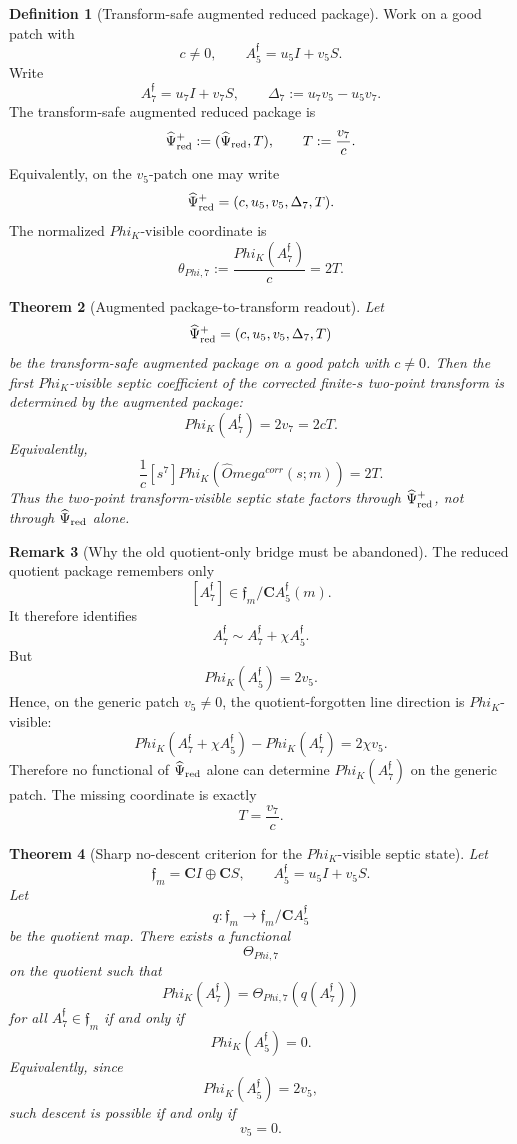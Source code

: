 \documentclass[11pt,a4paper]{amsart}
\def\Omega{Omega}%
\def\Phi{Phi}%
\def\corr{corr}%
\theoremstyle{plain}
\newtheorem{theorem}{Theorem}[section]
\theoremstyle{definition}
\newtheorem{definition}[theorem]{Definition}
\newtheorem{remark}[theorem]{Remark}
\newcommand{\corr}{\mathrm{corr}}
\begin{document}
\begin{definition}[Transform-safe augmented reduced package]
\label{def:transform-safe-augmented-reduced-package}
Work on a good patch with
\[
c\ne0,
\qquad
A_5^{\mathfrak f}=u_5I+v_5S.
\]
Write
\[
A_7^{\mathfrak f}=u_7I+v_7S,
\qquad
\Delta_7:=u_7v_5-u_5v_7.
\]
The transform-safe augmented reduced package is
\[
\widehat\Psi_{\rm red}^{+}
:=
(\widehat\Psi_{\rm red},T),
\qquad
T:=\frac{v_7}{c}.
\]
Equivalently, on the \(v_5\)-patch one may write
\[
\widehat\Psi_{\rm red}^{+}
=
(c,u_5,v_5,\Delta_7,T).
\]
The normalized \(\Phi_K\)-visible coordinate is
\[
\theta_{\Phi,7}
:=
\frac{\Phi_K(A_7^{\mathfrak f})}{c}
=
2T.
\]
\end{definition}

\begin{theorem}[Augmented package-to-transform readout]
\label{thm:augmented-package-to-transform-readout}
Let
\[
\widehat\Psi_{\rm red}^{+}
=
(c,u_5,v_5,\Delta_7,T)
\]
be the transform-safe augmented package on a good patch with \(c\ne0\). Then
the first \(\Phi_K\)-visible septic coefficient of the corrected finite-\(s\)
two-point transform is determined by the augmented package:
\[
\Phi_K(A_7^{\mathfrak f})
=
2v_7
=
2cT.
\]
Equivalently,
\[
\frac{1}{c}
[s^7]\Phi_K(\widehat\Omega^{\corr}(s;m))
=
2T.
\]
Thus the two-point transform-visible septic state factors through
\(\widehat\Psi_{\rm red}^{+}\), not through \(\widehat\Psi_{\rm red}\) alone.
\end{theorem}

\begin{remark}[Why the old quotient-only bridge must be abandoned]
\label{rem:old-quotient-only-bridge-abandoned}
The reduced quotient package remembers only
\[
[A_7^{\mathfrak f}]
\in
\mathfrak f_m/\mathbf C A_5^{\mathfrak f}(m).
\]
It therefore identifies
\[
A_7^{\mathfrak f}
\sim
A_7^{\mathfrak f}+\chi A_5^{\mathfrak f}.
\]
But
\[
\Phi_K(A_5^{\mathfrak f})=2v_5.
\]
Hence, on the generic patch \(v_5\ne0\), the quotient-forgotten line direction
is \(\Phi_K\)-visible:
\[
\Phi_K(A_7^{\mathfrak f}+\chi A_5^{\mathfrak f})
-
\Phi_K(A_7^{\mathfrak f})
=
2\chi v_5.
\]
Therefore no functional of \(\widehat\Psi_{\rm red}\) alone can determine
\(\Phi_K(A_7^{\mathfrak f})\) on the generic patch.  The missing coordinate is
exactly
\[
T=\frac{v_7}{c}.
\]
\end{remark}

\begin{theorem}[Sharp no-descent criterion for the \(\Phi_K\)-visible septic state]
\label{thm:sharp-no-descent-transform-visible-septic}
Let
\[
\mathfrak f_m=\mathbf C I\oplus\mathbf C S,
\qquad
A_5^{\mathfrak f}=u_5I+v_5S.
\]
Let
\[
q:\mathfrak f_m\to \mathfrak f_m/\mathbf C A_5^{\mathfrak f}
\]
be the quotient map.  There exists a functional
\[
\Theta_{\Phi,7}
\]
on the quotient such that
\[
\Phi_K(A_7^{\mathfrak f})
=
\Theta_{\Phi,7}(q(A_7^{\mathfrak f}))
\]
for all \(A_7^{\mathfrak f}\in\mathfrak f_m\) if and only if
\[
\Phi_K(A_5^{\mathfrak f})=0.
\]
Equivalently, since
\[
\Phi_K(A_5^{\mathfrak f})=2v_5,
\]
such descent is possible if and only if
\[
v_5=0.
\]
\end{theorem}
\end{document}
